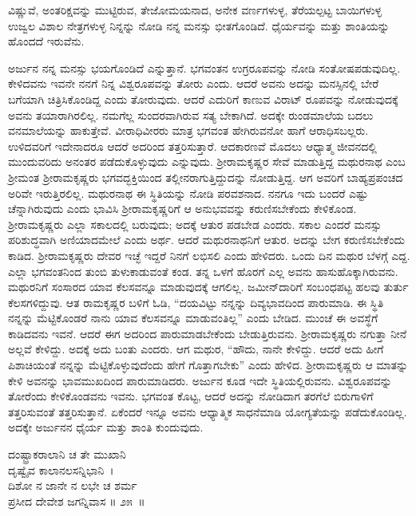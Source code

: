 \begin{artha}
ವಿಷ್ಣುವೆ, ಅಂತರಿಕ್ಷವನ್ನು ಮುಟ್ಟಿರುವ, ತೇಜೋಮಯನಾದ, ಅನೇಕ ವರ್ಣಗಳುಳ್ಳ, ತೆರೆಯಲ್ಪಟ್ಟ ಬಾಯಿಗಳುಳ್ಳ ಉಜ್ವಲ ವಿಶಾಲ ನೇತ್ರಗಳುಳ್ಳ ನಿನ್ನನ್ನು ನೋಡಿ ನನ್ನ ಮನಸ್ಸು ಭೀತಗೊಂಡಿದೆ. ಧೈರ್ಯವನ್ನು ಮತ್ತು ಶಾಂತಿಯನ್ನು ಹೊಂದದೆ ಇರುವೆನು.
\end{artha}

ಅರ್ಜುನ ನನ್ನ ಮನಸ್ಸು ಭಯಗೊಂಡಿದೆ ಎನ್ನುತ್ತಾನೆ. ಭಗವಂತನ ಉಗ್ರರೂಪವನ್ನು ನೋಡಿ ಸಂತೋಷಪಡುವುದಿಲ್ಲ. ಕೇಳಿದವನು ಇವನೇ ನನಗೆ ನಿನ್ನ ವಿಶ್ವರೂಪವನ್ನು ತೋರು ಎಂದು. ಆದರೆ ಅವನು ಅದನ್ನು ಮನಸ್ಸಿನಲ್ಲಿ ಬೇರೆ ಬಗೆಯಾಗಿ ಚಿತ್ರಿಸಿಕೊಂಡಿದ್ದ ಎಂದು ತೋರುವುದು. ಆದರೆ ಎದುರಿಗೆ ಕಾಣುವ ವಿರಾಟ್ ರೂಪವನ್ನು ನೋಡುವುದಕ್ಕೆ ಅವನು ತಯಾರಾಗಿರಲಿಲ್ಲ. ನಮಗೆಲ್ಲ ಸುಂದರವಾಗಿರುವ ಸತ್ಯ ಬೇಕಾಗಿದೆ. ಅದಕ್ಕೇ ರುಂಡಮಾಲೆಯ ಬದಲು ವನಮಾಲೆಯನ್ನು ಹಾಕುತ್ತೇವೆ. ವೀರಾಧಿವೀರರು ಮಾತ್ರ ಭಗವಂತ ಹೇಗಿರುವನೋ ಹಾಗೆ ಆರಾಧಿಸಬಲ್ಲರು. ಉಳಿದವರಿಗೆ ಇದೇನಾದರೂ ಆದರೆ ಅದರಿಂದ ತತ್ತರಿಸುತ್ತಾರೆ. ಆದಕಾರಣವೆ ಮೊದಲು ಆಧ್ಯಾತ್ಮ ಜೀವನದಲ್ಲಿ ಮುಂದುವರಿದು ಅನಂತರ ಪಡೆದುಕೊಳ್ಳುವುದು ಎನ್ನುವುದು. ಶ‍್ರೀರಾಮಕೃಷ್ಣರ ಸೇವೆ ಮಾಡುತ್ತಿದ್ದ ಮಥುರನಾಥ ಎಂಬ ಶ‍್ರೀಮಂತ ಶ‍್ರೀರಾಮಕೃಷ್ಣರು ಭಗವದ್ಭಕ್ತಿಯಿಂದ ತಲ್ಲೀನರಾಗುತ್ತಿದ್ದುದನ್ನು ನೋಡುತ್ತಿದ್ದ. ಆಗ ಅವರಿಗೆ ಬಾಹ್ಯಪ್ರಪಂಚದ ಅರಿವೇ ಇರುತ್ತಿರಲಿಲ್ಲ. ಮಥುರನಾಥ ಈ ಸ್ಥಿತಿಯನ್ನು ನೋಡಿ ಪರವಶನಾದ. ನನಗೂ ಇದು ಬಂದರೆ ಎಷ್ಟು ಚೆನ್ನಾಗಿರುವುದು ಎಂದು ಭಾವಿಸಿ ಶ‍್ರೀರಾಮಕೃಷ್ಣರಿಗೆ ಆ ಅನುಭವವನ್ನು ಕರುಣಿಸಬೇಕೆಂದು ಕೇಳಿಕೊಂಡ. ಶ‍್ರೀರಾಮಕೃಷ್ಣರು ಎಲ್ಲಾ ಸಕಾಲದಲ್ಲಿ ಬರುವುದು; ಅದಕ್ಕೆ ಆತುರ ಪಡಬೇಡ ಎಂದರು. ಸಕಾಲ ಎಂದರೆ ಮನಸ್ಸು ಪರಿಶುದ್ಧವಾಗಿ ಅಣಿಯಾದಮೇಲೆ ಎಂದು ಅರ್ಥ. ಆದರೆ ಮಥುರನಾಥನಿಗೆ ಆತುರ. ಅದನ್ನು ಬೇಗ ಕರುಣಿಸಬೇಕೆಂದು ಕಾಡಿದ. ಶ‍್ರೀರಾಮಕೃಷ್ಣರು ದೇವರ ಇಚ್ಛೆ ಇದ್ದರೆ ನಿನಗೆ ಲಭಿಸಲಿ ಎಂದು ಹೇಳಿದರು. ಒಂದು ದಿನ ಮಥುರ ಬೆಳಗ್ಗೆ ಎದ್ದ. ಎಲ್ಲಾ ಭಗವಂತನಿಂದ ತುಂಬಿ ತುಳುಕಾಡುವಂತೆ ಕಂಡ. ತನ್ನ ಒಳಗೆ ಹೊರಗೆ ಎಲ್ಲ ಅವನು ಹಾಸುಹೊಕ್ಕಾಗಿರುವನು. ಮಥುರನಿಗೆ ಸಂಸಾರದ ಯಾವ ಕೆಲಸವನ್ನೂ ಮಾಡುವುದಕ್ಕೆ ಆಗಲಿಲ್ಲ. ಜಮೀನ್​ದಾರಿಗೆ ಸಂಬಂಧಪಟ್ಟ ಹಲವು ತುರ್ತು ಕೆಲಸಗಳಿದ್ದುವು. ಆತ ರಾಮಕೃಷ್ಣರ ಬಳಿಗೆ ಓಡಿ, “ದಯವಿಟ್ಟು ನನ್ನನ್ನು ದಿವ್ಯಭಾವದಿಂದ ಪಾರುಮಾಡಿ. ಈ ಸ್ಥಿತಿ ನನ್ನನ್ನು ಮೆಟ್ಟಿಕೊಂಡರೆ ನಾನು ಯಾವ ಕೆಲಸವನ್ನೂ ಮಾಡುವಂತಿಲ್ಲ” ಎಂದು ಬೇಡಿದ. ಮುಂಚೆ ಈ ಅವಸ್ಥೆಗೆ ಕಾಡಿದವನು ಇವನೆ. ಆದರೆ ಈಗ ಅದರಿಂದ ಪಾರುಮಾಡಬೇಕೆಂದು ಬೇಡುತ್ತಿರುವನು. ಶ‍್ರೀರಾಮಕೃಷ್ಣರು ನಗುತ್ತಾ ನೀನೆ ಅಲ್ಲವೆ ಕೇಳಿದ್ದು. ಅದಕ್ಕೆ ಅದು ಬಂತು ಎಂದರು. ಆಗ ಮಥುರ, “ಹೌದು, ನಾನೇ ಕೇಳಿದ್ದು. ಆದರೆ ಅದು ಹೀಗೆ ಪಿಶಾಚಿಯಂತೆ ನನ್ನನ್ನು ಮೆಟ್ಟಿಕೊಳ್ಳುವುದೆಂದು ಹೇಗೆ ಗೊತ್ತಾಗಬೇಕು” ಎಂದು ಹೇಳಿದ. ಶ‍್ರೀರಾಮಕೃಷ್ಣರು ಆ ಮಾತನ್ನು ಕೇಳಿ ಅವನನ್ನು ಭಾವಮುಖದಿಂದ ಪಾರುಮಾಡಿದರು. ಅರ್ಜುನ ಕೂಡ ಇದೇ ಸ್ಥಿತಿಯಲ್ಲಿರುವನು. ವಿಶ್ವರೂಪವನ್ನು ತೋರೆಂದು ಕೇಳಿಕೊಂಡವನು ಇವನು. ಭಗವಂತ ಕೊಟ್ಟ, ಆದರೆ ಅದನ್ನು ನೋಡಿದಾಗ ತರಗೆಲೆ ಬಿರುಗಾಳಿಗೆ ತತ್ತರಿಸುವಂತೆ ತತ್ತರಿಸುತ್ತಾನೆ. ಏಕೆಂದರೆ ಇನ್ನೂ ಅವನು ಆಧ್ಯಾತ್ಮಿಕ ಸಾಧನೆಮಾಡಿ ಯೋಗ್ಯತೆಯನ್ನು ಪಡೆದುಕೊಂಡಿಲ್ಲ. ಅದಕ್ಕೇ ಅರ್ಜುನನ ಧೈರ್ಯ ಮತ್ತು ಶಾಂತಿ ಕುಂದುವುದು.

\begin{shloka}
ದಂಷ್ಟ್ರಾಕರಾಲಾನಿ ಚ ತೇ ಮುಖಾನಿ \\ ದೃಷ್ವೈವ ಕಾಲಾನಲಸನ್ನಿಭಾನಿ~।\\ದಿಶೋ ನ ಜಾನೇ ನ ಲಭೇ ಚ ಶರ್ಮ \\ ಪ್ರಸೀದ ದೇವೇಶ ಜಗನ್ನಿವಾಸ \hfill॥ ೨೫~॥
\end{shloka}

